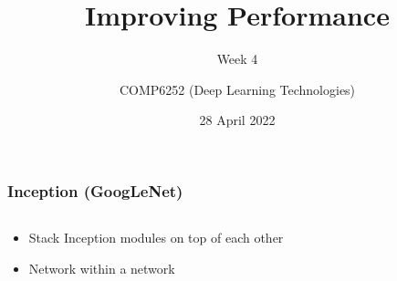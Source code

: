 \documentclass{beamer}
\begin{document}
\title{Improving Performance}
\subtitle{Week 4}
\author{COMP6252 (Deep Learning Technologies)}
 \date{28 April 2022}

\begin{frame}
    \frametitle{Inception (GoogLeNet)}
	\begin{columns}
		
\begin{column}{0.5\textwidth}

    \begin{itemize}
        \item Stack Inception modules on top of each other
        \item Network within a network
    \end{itemize}

    \begin{figure}
    \end{figure}
		

\end{column}
\end{columns}
\end{frame}
\end{document}
